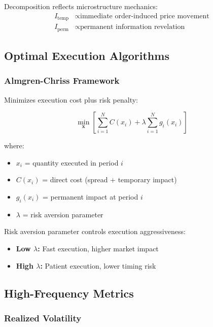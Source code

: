 \documentclass[12pt,a4paper]{article}
\begin{document}
Decomposition reflects microstructure mechanics:
\begin{align}
I_{\text{temp}} &\propto \text{immediate order-induced price movement} \\
I_{\text{perm}} &\propto \text{permanent information revelation}
\end{align}

\subsection{Optimal Execution Algorithms}

\subsubsection{Almgren-Chriss Framework}

Minimizes execution cost plus risk penalty:

\begin{equation}
\min_{\mathbf{x}} \left[ \sum_{i=1}^{N} C(x_i) + \lambda \sum_{i=1}^{N} g_i(x_i) \right]
\end{equation}

where:
\begin{itemize}
    \item $x_i$ = quantity executed in period $i$
    \item $C(x_i)$ = direct cost (spread + temporary impact)
    \item $g_i(x_i)$ = permanent impact at period $i$
    \item $\lambda$ = risk aversion parameter
\end{itemize}

Risk aversion parameter controls execution aggressiveness:
\begin{itemize}
    \item \textbf{Low $\lambda$:} Fast execution, higher market impact
    \item \textbf{High $\lambda$:} Patient execution, lower timing risk
\end{itemize}

\subsection{High-Frequency Metrics}

\subsubsection{Realized Volatility}
\end{document}
